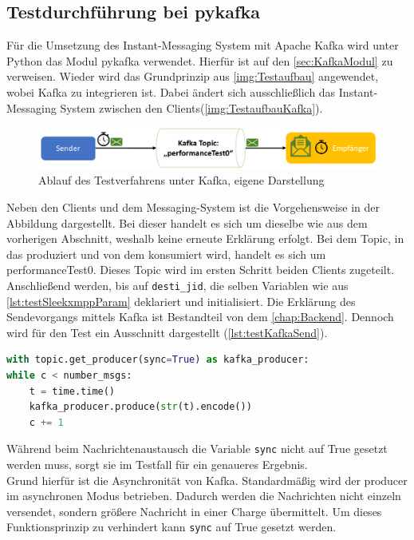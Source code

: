 \documentclass[a4paper,titlepage,halfparskip,12pt]{scrreprt}
\begin{document}
\begin{onehalfspacing}
\subsection*{Testdurchführung bei pykafka}
\label{subssec:Testpykafka}
Für die Umsetzung des Instant-Messaging System mit Apache Kafka wird unter Python das Modul pykafka verwendet. Hierfür ist auf den \autoref{sec:KafkaModul} zu verweisen. Wieder wird das Grundprinzip aus \autoref{img:Testaufbau} angewendet, wobei Kafka zu integrieren ist. Dabei ändert sich ausschließlich das Instant-Messaging System zwischen den Clients(\autoref{img:TestaufbauKafka}).
\begin{figure}[h]
	\centering
	\includegraphics[scale=0.6]{images/TestaufbauKafka}
	\caption{Ablauf des Testverfahrens unter Kafka, eigene Darstellung}
	\label{img:TestaufbauKafka}
\end{figure}
Neben den Clients und dem Messaging-System ist die Vorgehensweise in der Abbildung dargestellt. Bei dieser handelt es sich um dieselbe wie aus dem vorherigen Abschnitt, weshalb keine erneute Erklärung erfolgt. Bei dem Topic, in das produziert und von dem konsumiert wird, handelt es sich um \glqq performanceTest0\grqq. Dieses Topic wird im ersten Schritt beiden Clients zugeteilt. Anschließend werden, bis auf \texttt{desti\_jid}, die selben Variablen wie aus \autoref{lst:testSleekxmppParam} deklariert und initialisiert. Die Erklärung des Sendevorgangs mittels Kafka ist Bestandteil von dem \autoref{chap:Backend}. Dennoch wird für den Test ein Ausschnitt dargestellt (\autoref{lst:testKafkaSend}). 
\begin{lstlisting}[language=python, caption={Sendevorgang der Testnachricht unter Kafka}, label={lst:testKafkaSend}]
with topic.get_producer(sync=True) as kafka_producer:
while c < number_msgs:
	t = time.time()
	kafka_producer.produce(str(t).encode())
	c += 1
\end{lstlisting}
Während beim Nachrichtenaustausch die Variable \texttt{sync} nicht auf True gesetzt werden muss, sorgt sie im Testfall für ein genaueres Ergebnis.\\
Grund hierfür ist die Asynchronität von Kafka. Standardmäßig wird der producer im asynchronen Modus betrieben. Dadurch werden die Nachrichten nicht einzeln versendet, sondern größere Nachricht in einer Charge übermittelt. Um dieses Funktionsprinzip zu verhindert kann \texttt{sync} auf True gesetzt werden. \cite{pykafkaDocumentation}\\

\end{onehalfspacing}
\end{document}
